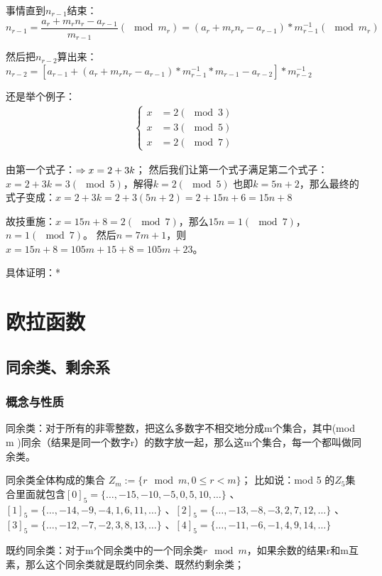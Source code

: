 \documentclass[12pt]{article}
\begin{document}
事情直到$n_{r-1}$结束：$n_{r-1}=\dfrac{a_{r}+m_{r}n_{r}-a_{r-1}}{m_{r-1}} (\mod m_{r})=(a_{r}+m_{r}n_{r}-a_{r-1})*m^{-1}_{r-1} (\mod m_{r})$

然后把$n_{r-2}$算出来：$n_{r-2}=[a_{r-1}+(a_{r}+m_{r}n_{r}-a_{r-1})*m^{-1}_{r-1}*m_{r-1}-a_{r-2}]*m^{-1}_{r-2}$


还是举个例子：
\begin{align*}
    \begin{cases}
        x&=2(\mod 3)\\
        x&=3(\mod 5)\\
        x&=2(\mod 7)
    \end{cases}
\end{align*}

由第一个式子：$\Rightarrow x = 2+3k\\$；
然后我们让第一个式子满足第二个式子：$x = 2+3k=3 (\mod 5)$，解得$k=2(\mod 5)$
也即$k=5n+2$，那么最终的式子变成：$x = 2+3k = 2+3(5n+2)=2+15n+6=15n+8$

故技重施：$x=15n+8=2(\mod 7)$，那么$15n=1(\mod 7)$，$n=1(\mod 7)$。
然后$n=7m+1$，则$x=15n+8=105m+15+8=105m+23$。

具体证明：*

\section{欧拉函数}

\subsection{同余类、剩余系}

\subsubsection{概念与性质}

同余类：对于所有的非零整数，把这么多数字不相交地分成m个集合，其中(mod m )同余（结果是同一个数字r）的数字放一起，那么这m个集合，每一个都叫做同余类。

同余类全体构成的集合 $Z_m:=\{r\mod m,0\leq r < m\}$；
比如说：mod 5 的$Z_{5}$集合里面就包含$[0]_5=\{\dots,-15,-10,-5,0,5,10,\dots\}$
、$[1]_5=\{\dots,-14,-9,-4,1,6,11,\dots\}$
、$[2]_5=\{\dots,-13,-8,-3,2,7,12,\dots\}$
、$[3]_5=\{\dots,-12,-7,-2,3,8,13,\dots\}$
、$[4]_5=\{\dots,-11,-6,-1,4,9,14,\dots\}$


既约同余类：对于m个同余类中的一个同余类$r\mod m$，如果余数的结果r和m互素，那么这个同余类就是既约同余类、既然约剩余类；
\end{document}
